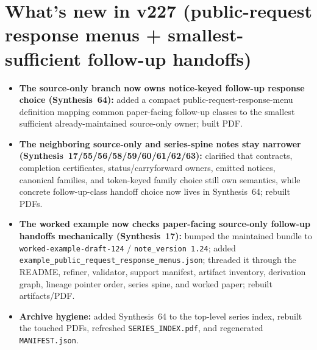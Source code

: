 \documentclass[11pt]{article}
\begin{document}
\section{What's new in v227 (public-request response menus + smallest-sufficient follow-up handoffs)}
\begin{itemize}[leftmargin=*]
\item \textbf{The source-only branch now owns notice-keyed follow-up response choice (Synthesis~64):} added a compact public-request-response-menu definition mapping common paper-facing follow-up classes to the smallest sufficient already-maintained source-only owner; built PDF.
\item \textbf{The neighboring source-only and series-spine notes stay narrower (Synthesis~17/55/56/58/59/60/61/62/63):} clarified that contracts, completion certificates, status/carryforward owners, emitted notices, canonical families, and token-keyed family choice still own semantics, while concrete follow-up-class handoff choice now lives in Synthesis~64; rebuilt PDFs.
\item \textbf{The worked example now checks paper-facing source-only follow-up handoffs mechanically (Synthesis~17):} bumped the maintained bundle to \texttt{worked-example-draft-124} / \texttt{note\_version 1.24}; added \texttt{example\_public\_request\_response\_menus.json}; threaded it through the README, refiner, validator, support manifest, artifact inventory, derivation graph, lineage pointer order, series spine, and worked paper; rebuilt artifacts/PDF.
\item \textbf{Archive hygiene:} added Synthesis~64 to the top-level series index, rebuilt the touched PDFs, refreshed \texttt{SERIES\_INDEX.pdf}, and regenerated \texttt{MANIFEST.json}.
\end{itemize}
\end{document}
